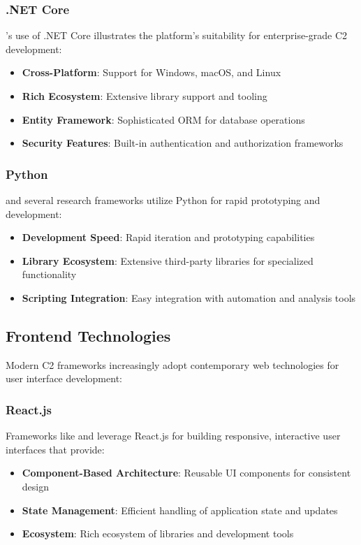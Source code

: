 \subsubsection{.NET Core}

's use of .NET Core illustrates the platform's suitability for enterprise-grade C2 development:
\begin{itemize}
\item \textbf{Cross-Platform}: Support for Windows, macOS, and Linux
\item \textbf{Rich Ecosystem}: Extensive library support and tooling
\item \textbf{Entity Framework}: Sophisticated ORM for database operations
\item \textbf{Security Features}: Built-in authentication and authorization frameworks
\end{itemize}

\subsubsection{Python}

 and several research frameworks utilize Python for rapid prototyping and development:
\begin{itemize}
\item \textbf{Development Speed}: Rapid iteration and prototyping capabilities
\item \textbf{Library Ecosystem}: Extensive third-party libraries for specialized functionality
\item \textbf{Scripting Integration}: Easy integration with automation and analysis tools
\end{itemize}

\subsection{Frontend Technologies}
\label{subsec:frontend_technologies}

Modern C2 frameworks increasingly adopt contemporary web technologies for user interface development:

\subsubsection{React.js}

Frameworks like  and  leverage React.js for building responsive, interactive user interfaces that provide:
\begin{itemize}
\item \textbf{Component-Based Architecture}: Reusable UI components for consistent design
\item \textbf{State Management}: Efficient handling of application state and updates
\item \textbf{Ecosystem}: Rich ecosystem of libraries and development tools
\end{itemize}

